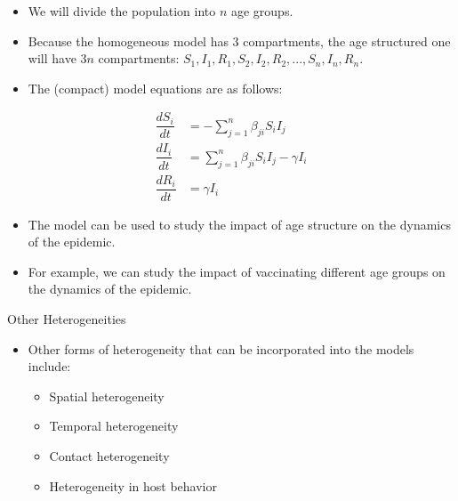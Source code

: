 \documentclass[
  ignorenonframetext,
]{beamer}
\providecommand{\tightlist}{%
  \setlength{\itemsep}{0pt}\setlength{\parskip}{0pt}}\usepackage{longtable,booktabs,array}
\begin{document}
\begin{frame}
\begin{itemize}
\item
  We will divide the population into \(n\) age groups.
\item
  Because the homogeneous model has 3 compartments, the age structured
  one will have \(3n\) compartments:
  \(S_1, I_1, R_1, S_2, I_2, R_2, ..., S_n, I_n, R_n\).
\end{itemize}
\end{frame}

\begin{frame}
\begin{itemize}
\tightlist
\item
  The (compact) model equations are as follows:
\end{itemize}

\begin{align*}
\dfrac{dS_i}{dt} &= -\sum_{j=1}^{n} \beta_{ji} S_i I_j \\
\dfrac{dI_i}{dt} &= \sum_{j=1}^{n} \beta_{ji} S_i I_j - \gamma I_i \\
\dfrac{dR_i}{dt} &= \gamma I_i
\end{align*}
\end{frame}

\begin{frame}
\begin{itemize}
\item
  The model can be used to study the impact of age structure on the
  dynamics of the epidemic.
\item
  For example, we can study the impact of vaccinating different age
  groups on the dynamics of the epidemic.
\end{itemize}
\end{frame}

\begin{frame}
\begin{block}{Other Heterogeneities}
\label{other-heterogeneities}
\begin{itemize}
\tightlist
\item
  Other forms of heterogeneity that can be incorporated into the models
  include:

  \begin{itemize}
  \tightlist
  \item
    Spatial heterogeneity
  \item
    Temporal heterogeneity
  \item
    Contact heterogeneity
  \item
    Heterogeneity in host behavior
  \end{itemize}
\end{itemize}
\end{block}
\end{frame}
\end{document}
